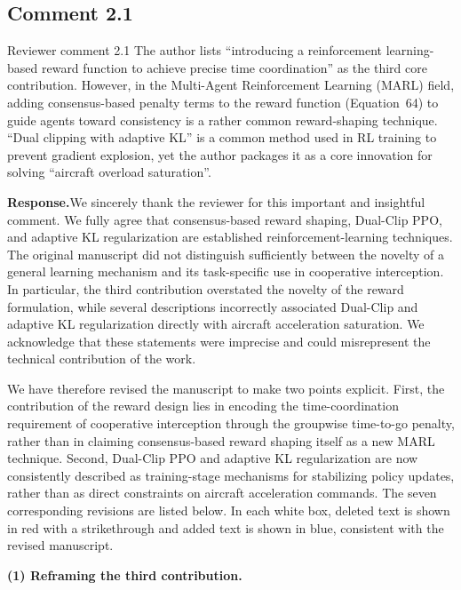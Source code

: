 \documentclass[11pt]{article}
\newcommand{\rsp}{\medskip\noindent\textbf{Response.}\quad}
\begin{document}
\subsection*{Comment 2.1}

\begin{reviewercomment}{Reviewer comment 2.1}
The author lists ``introducing a reinforcement learning-based reward function to
achieve precise time coordination'' as the third core contribution. However, in the
Multi-Agent Reinforcement Learning (MARL) field, adding consensus-based penalty terms
to the reward function (Equation~64) to guide agents toward consistency is a rather
common reward-shaping technique. ``Dual clipping with adaptive KL'' is a common method
used in RL training to prevent gradient explosion, yet the author packages it as a core
innovation for solving ``aircraft overload saturation''.
\end{reviewercomment}

\rsp We sincerely thank the reviewer for this important and insightful comment. We
fully agree that consensus-based reward shaping, Dual-Clip PPO, and adaptive KL
regularization are established reinforcement-learning techniques. The original
manuscript did not distinguish sufficiently between the novelty of a general learning
mechanism and its task-specific use in cooperative interception. In particular, the
third contribution overstated the novelty of the reward formulation, while several
descriptions incorrectly associated Dual-Clip and adaptive KL regularization directly
with aircraft acceleration saturation. We acknowledge that these statements were
imprecise and could misrepresent the technical contribution of the work.

We have therefore revised the manuscript to make two points explicit. First, the
contribution of the reward design lies in encoding the time-coordination requirement of
cooperative interception through the groupwise time-to-go penalty, rather than in
claiming consensus-based reward shaping itself as a new MARL technique. Second,
Dual-Clip PPO and adaptive KL regularization are now consistently described as
training-stage mechanisms for stabilizing policy updates, rather than as direct
constraints on aircraft acceleration commands. The seven corresponding revisions are
listed below. In each white box, deleted text is shown in red with a
strikethrough and added text is shown in blue, consistent with the revised
manuscript.

\medskip
\noindent\textbf{(1) Reframing the third contribution.}
\end{document}
